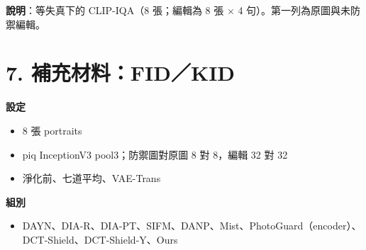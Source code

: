 \documentclass[10pt]{article}
\begin{document}
\textbf{說明}：等失真下的 CLIP-IQA（8 張；編輯為 8 張 $\times$ 4 句）。第一列為原圖與未防禦編輯。

\section*{7. 補充材料：FID／KID}
\textbf{設定}
\begin{itemize}
  \item 8 張 portraits
  \item piq InceptionV3 pool3；防禦圖對原圖 8 對 8，編輯 32 對 32
  \item 淨化前、七道平均、VAE-Trans
\end{itemize}
\textbf{組別}
\begin{itemize}
  \item DAYN、DIA-R、DIA-PT、SIFM、DANP、Mist、PhotoGuard（encoder）、DCT-Shield、DCT-Shield-Y、Ours
\end{itemize}
\end{document}
